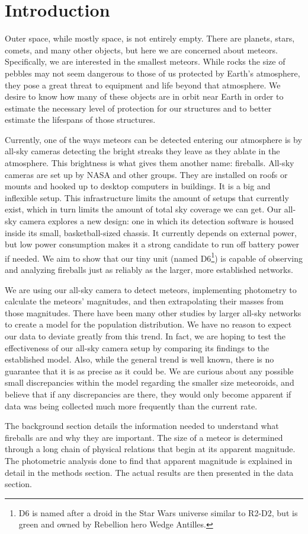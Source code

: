 \chapter{Introduction}

Outer space, while mostly space, is not entirely empty.  There are planets, stars, comets, and many other objects, but here we are concerned about meteors. Specifically, we are interested in the smallest meteors. While rocks the size of pebbles may not seem dangerous to those of us protected by Earth's atmosphere, they pose a great threat to equipment and life beyond that atmosphere. We desire to know how many of these objects are in orbit near Earth in order to estimate the necessary level of protection for our structures and to better estimate the lifespans of those structures.

Currently, one of the ways meteors can be detected entering our atmosphere is by all-sky cameras detecting the bright streaks they leave as they ablate in the atmosphere. This brightness is what gives them another name: fireballs. All-sky cameras are set up by NASA and other groups\cite{Jenniskens2011,Trigo-Rodriguez2007}. They are installed on roofs or mounts and hooked up to desktop computers in buildings. It is a big and inflexible setup. This infrastructure limits the amount of setups that currently exist, which in turn limits the amount of total sky coverage we can get. Our all-sky camera explores a new design: one in which its detection software is housed inside its small, basketball-sized chassis. It currently depends on external power, but low power consumption makes it a strong candidate to run off battery power if needed. We aim to show that our tiny unit (named D6\footnote{D6 is named after a droid in the Star Wars universe similar to R2-D2, but is green and owned by Rebellion hero Wedge Antilles.}) is capable of observing and analyzing fireballs just as reliably as the larger, more established networks.

We are using our all-sky camera to detect meteors, implementing photometry to calculate the meteors' magnitudes, and then extrapolating their masses from those magnitudes. There have been many other studies by larger all-sky networks to create a model for the population distribution. We have no reason to expect our data to deviate greatly from this trend. In fact, we are hoping to test the effectiveness of our all-sky camera setup by comparing its findings to the established model. Also, while the general trend is well known, there is no guarantee that it is as precise as it could be. We are curious about any possible small discrepancies within the model regarding the smaller size meteoroids, and believe that if any discrepancies are there, they would only become apparent if data was being collected much more frequently than the current rate.

The background section details the information needed to understand what fireballs are and why they are important. The size of a meteor is determined through a long chain of physical relations that begin at its apparent magnitude. The photometric analysis done to find that apparent magnitude is explained in detail in the methods section. The actual results are then presented in the data section.

